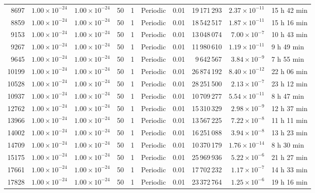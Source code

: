 \begin{landscape}
\begin{table}[p]
{\begin{tabular}{rrrrrlrrrl}
8697 & $1.00\times 10^{-24}$ & $1.00\times 10^{-24}$ & 50 & 1 & Periodic & 0.01 & 19\,171\,293 & $2.37\times 10^{-11}$ & 15 h 42 min \\
8859 & $1.00\times 10^{-24}$ & $1.00\times 10^{-24}$ & 50 & 1 & Periodic & 0.01 & 18\,542\,517 & $1.87\times 10^{-11}$ & 15 h 16 min \\
9153 & $1.00\times 10^{-24}$ & $1.00\times 10^{-24}$ & 50 & 1 & Periodic & 0.01 & 13\,048\,074 & $7.00\times 10^{-7}$ & 10 h 43 min \\
9267 & $1.00\times 10^{-24}$ & $1.00\times 10^{-24}$ & 50 & 1 & Periodic & 0.01 & 11\,980\,610 & $1.19\times 10^{-11}$ & 9 h 49 min \\
9645 & $1.00\times 10^{-24}$ & $1.00\times 10^{-24}$ & 50 & 1 & Periodic & 0.01 & 9\,642\,567 & $3.84\times 10^{-9}$ & 7 h 55 min \\
10199 & $1.00\times 10^{-24}$ & $1.00\times 10^{-24}$ & 50 & 1 & Periodic & 0.01 & 26\,874\,192 & $8.40\times 10^{-12}$ & 22 h 06 min \\
10528 & $1.00\times 10^{-24}$ & $1.00\times 10^{-24}$ & 50 & 1 & Periodic & 0.01 & 28\,251\,500 & $2.13\times 10^{-7}$ & 23 h 12 min \\
10937 & $1.00\times 10^{-24}$ & $1.00\times 10^{-24}$ & 50 & 1 & Periodic & 0.01 & 10\,709\,277 & $5.54\times 10^{-11}$ & 8 h 47 min \\
12762 & $1.00\times 10^{-24}$ & $1.00\times 10^{-24}$ & 50 & 1 & Periodic & 0.01 & 15\,310\,329 & $2.98\times 10^{-9}$ & 12 h 37 min \\
13966 & $1.00\times 10^{-24}$ & $1.00\times 10^{-24}$ & 50 & 1 & Periodic & 0.01 & 13\,567\,225 & $7.22\times 10^{-8}$ & 11 h 11 min \\
14002 & $1.00\times 10^{-24}$ & $1.00\times 10^{-24}$ & 50 & 1 & Periodic & 0.01 & 16\,251\,088 & $3.94\times 10^{-8}$ & 13 h 23 min \\
14709 & $1.00\times 10^{-24}$ & $1.00\times 10^{-24}$ & 50 & 1 & Periodic & 0.01 & 10\,370\,179 & $1.76\times 10^{-14}$ & 8 h 30 min \\
15175 & $1.00\times 10^{-24}$ & $1.00\times 10^{-24}$ & 50 & 1 & Periodic & 0.01 & 25\,969\,936 & $5.22\times 10^{-6}$ & 21 h 27 min \\
17661 & $1.00\times 10^{-24}$ & $1.00\times 10^{-24}$ & 50 & 1 & Periodic & 0.01 & 17\,702\,232 & $1.17\times 10^{-7}$ & 14 h 33 min \\
17828 & $1.00\times 10^{-24}$ & $1.00\times 10^{-24}$ & 50 & 1 & Periodic & 0.01 & 23\,372\,764 & $1.25\times 10^{-6}$ & 19 h 16 min \\

\end{tabular}}
\end{table}
\end{landscape}
